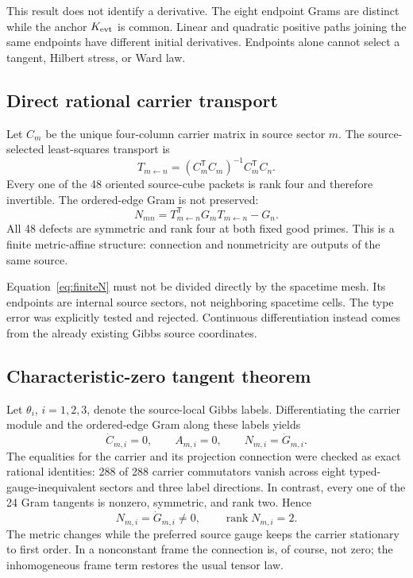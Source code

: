 \documentclass[11pt]{article}
\theoremstyle{definition}
\theoremstyle{remark}
\newcommand{\rank}{\operatorname{rank}}
\begin{document}
This result does not identify a derivative. The eight endpoint Grams are distinct while the anchor $K_{\rm evt}$ is common. Linear and quadratic positive paths joining the same endpoints have different initial derivatives. Endpoints alone cannot select a tangent, Hilbert stress, or Ward law.

\subsection{Direct rational carrier transport}

Let $C_m$ be the unique four-column carrier matrix in source sector $m$. The source-selected least-squares transport is
\begin{equation}\label{eq:transport}
 T_{m\leftarrow n}=(C_m^{\mathsf T}C_m)^{-1}C_m^{\mathsf T}C_n.
\end{equation}
Every one of the 48 oriented source-cube packets is rank four and therefore invertible. The ordered-edge Gram is not preserved:
\begin{equation}\label{eq:finiteN}
 N_{mn}=T_{m\leftarrow n}^{\mathsf T}G_mT_{m\leftarrow n}-G_n.
\end{equation}
All 48 defects are symmetric and rank four at both fixed good primes. This is a finite metric-affine structure: connection and nonmetricity are outputs of the same source.

Equation~\eqref{eq:finiteN} must not be divided directly by the spacetime mesh. Its endpoints are internal source sectors, not neighboring spacetime cells. The type error was explicitly tested and rejected. Continuous differentiation instead comes from the already existing Gibbs source coordinates.

\subsection{Characteristic-zero tangent theorem}

Let $\theta_i$, $i=1,2,3$, denote the source-local Gibbs labels. Differentiating the carrier module and the ordered-edge Gram along these labels yields
\begin{equation}
 \dot C_{m,i}=0,
 \qquad A_{m,i}=0,
 \qquad N_{m,i}=\dot G_{m,i}.
\end{equation}
The equalities for the carrier and its projection connection were checked as exact rational identities: 288 of 288 carrier commutators vanish across eight typed-gauge-inequivalent sectors and three label directions. In contrast, every one of the 24 Gram tangents is nonzero, symmetric, and rank two. Hence
\begin{equation}\label{eq:localN}
 N_{m,i}=\dot G_{m,i}\ne0,
 \qquad \rank N_{m,i}=2.
\end{equation}
The metric changes while the preferred source gauge keeps the carrier stationary to first order. In a nonconstant frame the connection is, of course, not zero; the inhomogeneous frame term restores the usual tensor law.
\end{document}
